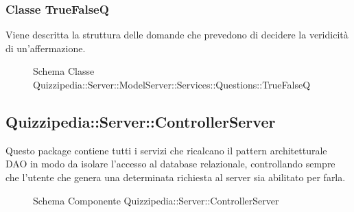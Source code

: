 \subsubsection{Classe TrueFalseQ}
Viene descritta la struttura delle domande che prevedono di decidere la veridicità di un'affermazione.
\begin{figure}[H]
\centering
\noindent{}
\caption{Schema Classe Quizzipedia::Server::ModelServer::Services::Questions::TrueFalseQ}
\end{figure}
\subsection{Quizzipedia::Server::ControllerServer}
Questo package contiene tutti i servizi che ricalcano il pattern architetturale DAO in modo da isolare l'accesso al database relazionale, controllando sempre che l'utente che genera una determinata richiesta al server sia abilitato per farla.
\begin{figure}[H]
\centering
\noindent{}
\caption[Quizzipedia::Server::ControllerServer]{Schema Componente Quizzipedia::Server::ControllerServer}
\end{figure}
